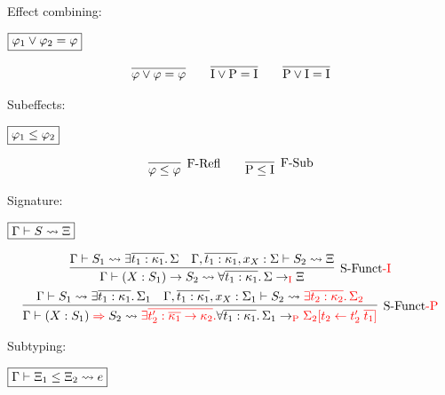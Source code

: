 Effect combining:

$\fbox{$\varphi_1 \lor \varphi_2 = \varphi$}$

\begin{gather*}
  \infer{\varphi \lor \varphi = \varphi}{}
  \hspace{2em}
  \infer{\symI \lor \symP = \symI}{}
  \hspace{2em}
  \infer{\symP \lor \symI = \symI}{}
\end{gather*}

Subeffects:

$\fbox{$\varphi_1 \leq \varphi_2$}$

\begin{gather*}
  \infer[\text{F-Refl}]{\varphi \leq \varphi}{}
  \hspace{2em}
  \infer[\text{F-Sub}]{\symP \leq \symI}{}
\end{gather*}

Signature:

$\fbox{$\Gamma \vdash S \rightsquigarrow \Xi$}$

\begin{gather*}
  \infer[\text{S-Funct\textcolor{red}{-I}}]{\Gamma \vdash (X: S_1) \to S_2 \elaborate \forall \overline{t_1: \kappa_1}\ldotp \Sigma \to_{\textcolor{red}{\symI}} \Xi}{
    \Gamma \vdash S_1 \elaborate \exists \overline{t_1: \kappa_1}\ldotp \Sigma
    &
    \Gamma, \overline{t_1: \kappa_1}, x_X: \Sigma \vdash S_2 \elaborate \Xi
  }
  \\
  \infer[\text{S-Funct\textcolor{red}{-P}}]{\Gamma \vdash (X: S_1) \mathrel{\textcolor{red}{\Rightarrow}} S_2 \elaborate \textcolor{red}{\exists \overline{t_2': \overline{\kappa_1} \to \kappa_2}\ldotp} \forall \overline{t_1: \kappa_1}\ldotp \Sigma_1 \to_{\textcolor{red}{\symP}} \textcolor{red}{\Sigma_2[t_2 \assign t_2'\; \overline{t_1}]}}{
    \Gamma \vdash S_1 \elaborate \exists \overline{t_1: \kappa_1}\ldotp \Sigma_1
    &
    \Gamma, \overline{t_1: \kappa_1}, x_X: \Sigma_1 \vdash S_2 \elaborate \textcolor{red}{\exists \overline{t_2: \kappa_2}\ldotp \Sigma_2}
  }
\end{gather*}

Subtyping:

$\fbox{$\Gamma \vdash \Xi_1 \leq \Xi_2 \rightsquigarrow e$}$

